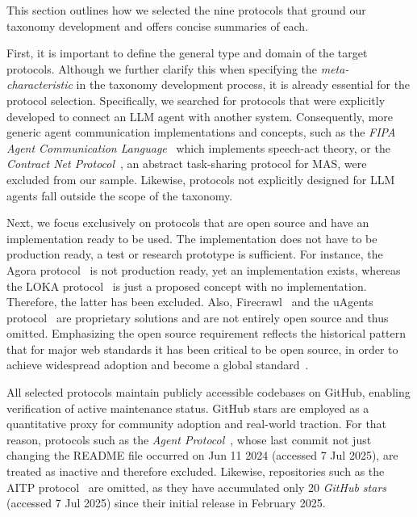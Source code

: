 \documentclass[pdflatex,sn-mathphys-num]{sn-jnl}%
\theoremstyle{thmstyleone}%
\theoremstyle{thmstyletwo}%
\theoremstyle{thmstylethree}%
\begin{document}
This section outlines how we selected the nine protocols that ground our taxonomy development and offers concise summaries of each.

First, it is important to define the general type and domain of the target protocols. Although we further clarify this when specifying the \textit{meta-characteristic} in the taxonomy development process, it is already essential for the protocol selection. Specifically, we searched for protocols that were explicitly developed to connect an LLM agent with another system. Consequently, more generic agent communication implementations and concepts, such as the \textit{FIPA Agent Communication Language}~\cite{o1998fipa} which implements speech-act theory, or the \textit{Contract Net Protocol}~\cite{smith1980contract}, an abstract task-sharing protocol for MAS, were excluded from our sample. Likewise, protocols not explicitly designed for LLM agents fall outside the scope of the taxonomy.

Next, we focus exclusively on protocols that are open source and have an implementation ready to be used. The implementation does not have to be production ready, a test or research prototype is sufficient. For instance, the Agora protocol~\cite{marro2024scalable} is not production ready, yet an implementation exists, whereas the LOKA protocol~\cite{ranjan2025loka} is just a proposed concept with no implementation. Therefore, the latter has been excluded. Also, Firecrawl~\cite{firecrawlonline} and the uAgents protocol~\cite{uagentsonline} are proprietary solutions and are not entirely open source and thus omitted. Emphasizing the open source requirement reflects the historical pattern that for major web standards it has been critical to be open source, in order to achieve widespread adoption and become a global standard~\cite{gamalielsson2024open}.

All selected protocols maintain publicly accessible codebases on GitHub, enabling verification of active maintenance status. GitHub stars are employed as a quantitative proxy for community adoption and real-world traction. For that reason, protocols such as the \textit{Agent Protocol}~\cite{agentprotocolgit}, whose last commit not just changing the README file occurred on Jun 11 2024 (accessed 7 Jul 2025), are treated as inactive and therefore excluded. Likewise, repositories such as the AITP protocol~\cite{nearaitpgit} are omitted, as they have accumulated only 20 \textit{GitHub stars} (accessed 7 Jul 2025) since their initial release in February 2025.
\end{document}
